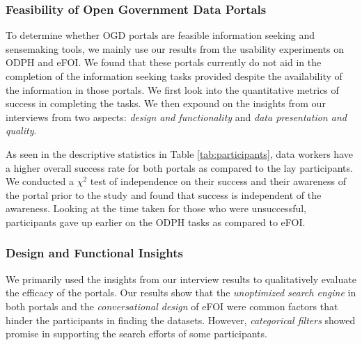\documentclass{sigchi}
\begin{document}
\subsubsection{Feasibility of Open Government Data Portals}
To determine whether OGD portals are feasible information seeking and sensemaking tools, we mainly use our results from the usability experiments on ODPH and eFOI. We found that these portals currently do not aid in the completion of the information seeking tasks provided despite the availability of the information in those portals. We first look into the quantitative metrics of success in completing the tasks. We then expound on the insights from our interviews from two aspects: \textit{design and functionality} and \textit{data presentation and quality}.

As seen in the descriptive statistics in Table \ref{tab:participants}, data workers have a higher overall success rate for both portals as compared to the lay participants. We conducted a $\chi^2$ test of independence on their success and their awareness of the portal prior to the study and found that success is independent of the awareness. Looking at the time taken for those who were unsuccessful, participants gave up earlier on the ODPH tasks as compared to eFOI. 



\subsubsection{Design and Functional Insights}
We primarily used the insights from our interview results to qualitatively evaluate the efficacy of the portals. Our results show that the \textit{unoptimized search engine} in both portals and the \textit{conversational design} of eFOI were common factors that hinder the participants in finding the datasets. However, \textit{categorical filters} showed promise in supporting the search efforts of some participants. 
\end{document}
